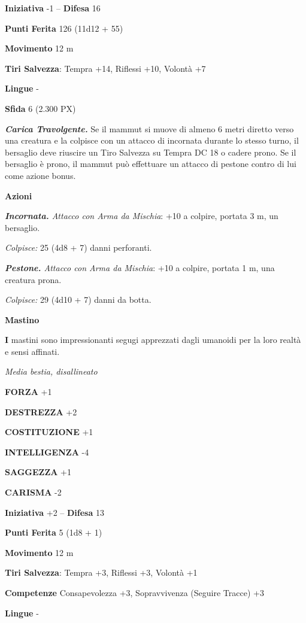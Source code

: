 \begin{multicols}{2}
	\textbf{Iniziativa} -1 -- \textbf{Difesa} 16

	\textbf{Punti Ferita} 126 (11d12 + 55)

	\textbf{Movimento} 12 m

	\textbf{Tiri Salvezza}: Tempra +14, Riflessi +10, Volontà +7

	\textbf{Lingue} -

	\textbf{Sfida} 6 (2.300 PX)

	\textit{\textbf{Carica Travolgente.}} Se il mammut si muove di almeno 6 metri diretto verso una creatura e la colpisce con un attacco di incornata durante lo stesso turno, il bersaglio deve riuscire un Tiro Salvezza su Tempra DC 18 o cadere prono. Se il bersaglio è prono, il mammut può effettuare un attacco di pestone contro di lui come azione bonus.

	\textbf{Azioni}

	\textit{\textbf{Incornata.} Attacco con Arma da Mischia}: +10 a colpire, portata 3 m, un bersaglio.

	\textit{Colpisce:} 25 (4d8 + 7) danni perforanti.

	\textit{\textbf{Pestone.} Attacco con Arma da Mischia}: +10 a colpire, portata 1 m, una creatura prona.

	\textit{Colpisce:} 29 (4d10 + 7) danni da botta.

	\medskip\textbf{Mastino}

	\textbf{I} mastini sono impressionanti segugi apprezzati dagli umanoidi per la loro realtà e sensi affinati.

	\textit{Media bestia, disallineato}

	\textbf{FORZA} +1

	\textbf{DESTREZZA} +2

	\textbf{COSTITUZIONE} +1

	\textbf{INTELLIGENZA} -4

	\textbf{SAGGEZZA} +1

	\textbf{CARISMA} -2

	\textbf{Iniziativa} +2 -- \textbf{Difesa} 13

	\textbf{Punti Ferita} 5 (1d8 + 1)

	\textbf{Movimento} 12 m

	\textbf{Tiri Salvezza}: Tempra +3, Riflessi +3, Volontà +1

	\textbf{Competenze} Consapevolezza +3, Sopravvivenza (Seguire Tracce) +3

	\textbf{Lingue} -


\end{multicols}
